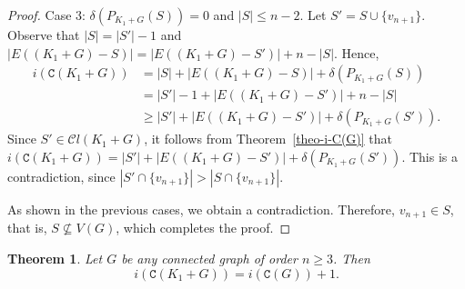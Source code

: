 \documentclass[12pt]{article}
\newtheorem{theorem}[remark]{Theorem}
\begin{document}
\begin{proof}
\noindent
Case 3: $\delta(P_{K_1+G}(S))=0$ and $|S|\leq n-2$. Let $S' = S\cup \{v_{n+1}\}$. Observe that $|S|=|S'|-1$ and $|E((K_1+ G) - S)| = |E((K_1+ G) - S')|+ n-|S|$. Hence,
\begin{equation*}
\begin{split}
i(\mathtt{C}(K_1+ G))&= |S| + |E((K_1+G)-S)| + \delta(P_{K_1+G}(S))\\[4pt]
&=|S'|-1 + |E((K_1+ G) - S')|+n-|S| \\[4pt]
&\geq |S'| + |E((K_1+G)-S')| + \delta(P_{K_1+G}(S')).
\end{split}
\end{equation*}
Since $S'\in \mathcal{C}l(K_1+G)$, it follows from Theorem~\ref{theo-i-C(G)} that $i(\mathtt{C}(K_1+ G))=|S'| + |E((K_1+G)-S')| + \delta(P_{K_1+G}(S'))$. This is a contradiction, since $|S'\cap \{v_{n+1}\}| > |S\cap \{v_{n+1}\}|$. 


\vspace{.25cm}

\noindent
As shown in the previous cases, we obtain a contradiction. Therefore, $v_{n+1} \in S$, that is, $S\not\subseteq V(G)$, which completes the proof.
\end{proof}



\begin{theorem}\label{theo:iCK1+G}
Let $G$ be any connected graph of order $n \geq 3$. Then
$$i(\mathtt{C}(K_1+G)) = i(\mathtt{C}(G))+1.$$
\end{theorem}
	
\end{document}
